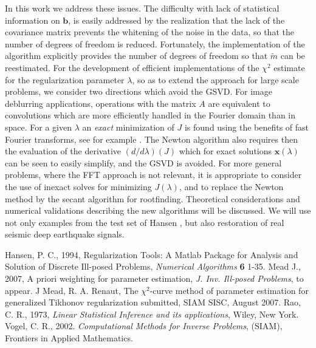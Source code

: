 \documentclass{report}
\begin{document}
In this work we address these issues. The difficulty with lack of
statistical information on $\mathbf{b}$, is easily addressed by the
realization that the lack of the covariance matrix prevents the whitening
of the noise in the data, so that the number of degrees of freedom is
reduced. Fortunately, the implementation of the algorithm explicitly
provides the number of degrees of freedom so that $\tilde{m}$ can be
reestimated. For the development of efficient implementations of the
$\chi^2$ estimate for the regularization parameter $\lambda$, so as to
extend the approach for large scale problems, we consider two directions
which avoid the GSVD. For image deblurring applications, operations with
the matrix $A$ are equivalent to convolutions which are more efficiently
handled in the Fourier domain than in space. For a given $\lambda$ an
\textit{exact} minimization of $J$ is found using the benefits of fast
Fourier transforms, see for example \cite{Vogel:02}. The Newton algorithm
also requires then the evaluation of the derivative $(d/d\lambda)(J)$
which for exact solutions $\mathbf{x}(\lambda)$ can be seen to easily
simplify, and the GSVD is avoided. For more general problems, where the
FFT approach is not relevant, it is appropriate to consider the use of
inexact solves for minimizing $J(\lambda)$, and to replace the Newton
method by the secant algorithm for rootfinding. Theoretical
considerations and numerical validations describing the new algorithms
will be discussed. We will use not only examples from the test set of
Hansen \cite{hansen:94}, but also restoration of real seismic deep
earthquake signals.




\begin{thebibliography}{99}
 Hansen, P. C., 1994, Regularization Tools: A Matlab Package for
Analysis and Solution of Discrete Ill-posed Problems, {\it Numerical
Algorithms} {\bf 6} 1-35.
 Mead J., 2007, A priori weighting for parameter
estimation, {\it J. Inv. Ill-posed Problems}, to appear.
 J Mead, R. A. Renaut, The $\chi^2$-curve method
of parameter estimation for generalized Tikhonov regularization
submitted, SIAM SISC, August 2007.
 Rao, C. R., 1973, {\it Linear Statistical Inference and
its applications}, Wiley, New York.
Vogel, C. R., 2002. {\it Computational Methods for Inverse Problems},
(SIAM), Frontiers in Applied Mathematics.
\end{thebibliography}
\additional
\end{document}
